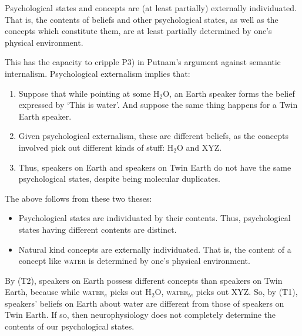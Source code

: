 \begin{objection}\leavevmode
\begin{definition}
Psychological states and concepts are (at least partially) externally individuated. That is, the contents of beliefs and other psychological states, as well as the concepts which constitute them, are at least partially determined by one's physical environment.
\end{definition}
This has the capacity to cripple P3) in Putnam's argument against semantic internalism. Psychological externalism implies that:
\begin{enumerate}
  \item Suppose that while pointing at some H$_2$O, an Earth speaker forms the belief expressed by `This is water'. And suppose the same thing happens for a Twin Earth speaker.
  \item Given psychological externalism, these are different beliefs, as the concepts involved pick out different kinds of stuff: H$_2$O and XYZ.
  \item Thus, speakers on Earth and speakers on Twin Earth do not have the same psychological states, despite being molecular duplicates.
\end{enumerate}
The above follows from these two theses:
\begin{itemize}
  \item[(T1)] Psychological states are individuated by their contents. Thus, psychological states having different contents are distinct.
  \item[(T2)] Natural kind concepts are externally individuated. That is, the content of a concept like \textsc{water} is determined by one's physical environment.
\end{itemize}
By (T2), speakers on Earth possess different concepts than speakers on Twin Earth, because while \textsc{water}$_{e}$ picks out H$_2$O, \textsc{water}$_{te}$ picks out XYZ. So, by (T1), speakers' beliefs on Earth about water are different from those of speakers on Twin Earth. If so, then neurophysiology does not completely determine the contents of our psychological states.
\end{objection}
